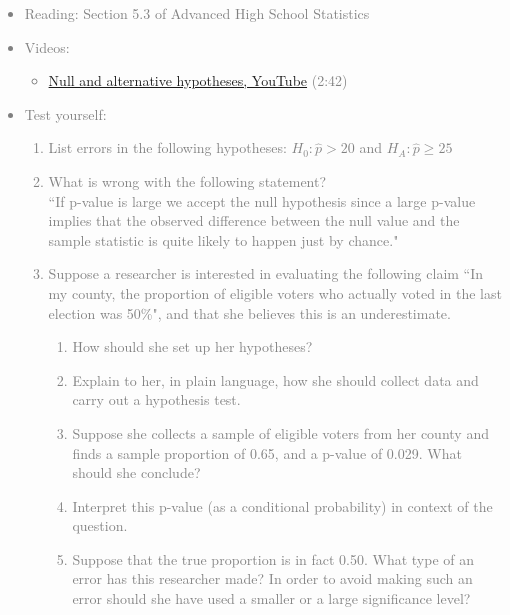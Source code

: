 \documentclass[11pt]{article}
\newcommand{\gray}[1]{\textcolor{gray}{#1}}
\begin{document}
\gray{
{\it
\vspace{-0.5cm}
\begin{itemize}
\renewcommand{\labelitemi}{{\textcolor{dark}{$\ast$}}}
\item Reading: Section 5.3 of Advanced High School Statistics
\item Videos:
\begin{itemize}
\item \href{http://www.youtube.com/watch?v=5N7L1cGCL-w}{Null and alternative hypotheses, YouTube} (2:42)
\end{itemize}
\item Test yourself: 
{\small
\begin{enumerate}
\item List errors in the following hypotheses: $H_0: \hat{p} > 20$ and $H_A: \hat{p} \ge 25$
\item What is wrong with the following statement? \\
``If p-value is large we accept the null hypothesis since a large p-value implies that the observed difference between the null value and the sample statistic is quite likely to happen just by chance."
\item Suppose a researcher is interested in evaluating the following claim ``In my county, the proportion of eligible voters who actually voted in the last election was 50\%", and that she believes this is an underestimate.
\begin{enumerate}
\item How should she set up her hypotheses? 
\item Explain to her, in plain language, how she should collect data and carry out a hypothesis test.
\item Suppose she collects a sample of eligible voters from her county and finds a sample proportion of 0.65, and a p-value of 0.029. What should she conclude?
\item Interpret this p-value (as a conditional probability) in context of the question.
\item Suppose that the true proportion is in fact 0.50. What type of an error has this researcher made? In order to avoid making such an error should she have used a smaller or a large significance level?
\end{enumerate}
\end{enumerate}
}
\end{itemize}
}}
\end{document}
